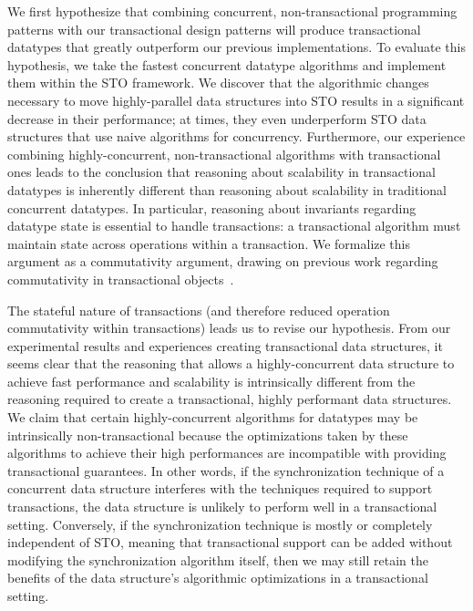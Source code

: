 We first hypothesize that combining concurrent, non-transactional programming patterns with our transactional design patterns will produce transactional datatypes that greatly outperform our previous implementations. To evaluate this hypothesis, we take the fastest concurrent datatype algorithms and implement them within the STO framework. We discover that the algorithmic changes necessary to move highly-parallel data structures into STO results in a significant decrease in their performance; at times, they even underperform STO data structures that use naive algorithms for concurrency.
Furthermore, our experience combining highly-concurrent, non-transactional algorithms with transactional ones leads to the conclusion that reasoning about scalability in transactional datatypes is inherently different than reasoning about scalability in traditional concurrent datatypes. In particular, reasoning about invariants regarding datatype state is essential to handle transactions: a transactional algorithm must maintain state across operations within a transaction. We formalize this argument as a commutativity argument, drawing on previous work regarding commutativity in transactional objects~\cite{weihl}.

The stateful nature of transactions (and therefore reduced operation commutativity within transactions) leads us to revise our hypothesis. From our experimental results and experiences creating transactional data structures, it seems clear that the reasoning that allows a highly-concurrent data structure to achieve fast performance and scalability is intrinsically different from the reasoning required to create a transactional, highly performant data structures. 
We claim that certain highly-concurrent algorithms for datatypes may be intrinsically non-transactional because the optimizations taken by these algorithms to achieve their high performances are incompatible with providing transactional guarantees. In other words, if the synchronization technique of a concurrent data structure interferes with the techniques required to support transactions, the data structure is unlikely to perform well in a transactional setting. Conversely, if the synchronization technique is mostly or completely independent of STO, meaning that transactional support can be added without modifying the synchronization algorithm itself, then we may still retain the benefits of the data structure's algorithmic optimizations in a transactional setting.

